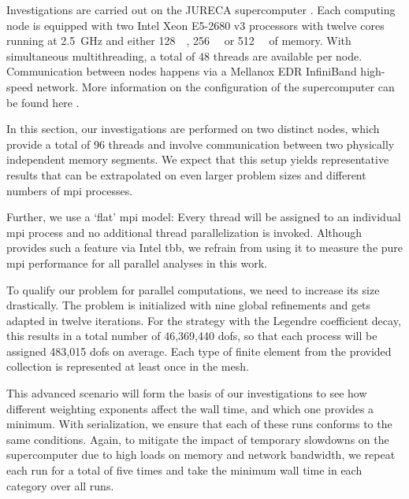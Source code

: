 
Investigations are carried out on the JURECA supercomputer \parencite{krause2016,jureca}. Each computing node is equipped with two Intel\textsuperscript{\textregistered} Xeon\textsuperscript{\textregistered} E5-2680 v3 processors with twelve cores running at \SI{2.5}{\giga\hertz} and either \SI{128}{\giga\byte}, \SI{256}{\giga\byte} or \SI{512}{\giga\byte} of memory. With simultaneous multithreading, a total of 48 threads are available per node. Communication between nodes happens via a Mellanox EDR InfiniBand high-speed network. More information on the configuration of the supercomputer can be found here \textcite{jureca}.

In this section, our investigations are performed on two distinct nodes, which provide a total of 96 threads and involve communication between two physically independent memory segments. We expect that this setup yields representative results that can be extrapolated on even larger problem sizes and different numbers of \gls{mpi} processes.

Further, we use a `flat' \gls{mpi} model: Every thread will be assigned to an individual \gls{mpi} process and no additional thread parallelization is invoked. Although \dealii{} provides such a feature via Intel\textsuperscript{\textregistered} \gls{tbb}, we refrain from using it to measure the pure \gls{mpi} performance for all parallel analyses in this work.


To qualify our problem for parallel computations, we need to increase its size drastically. The problem is initialized with nine global refinements and gets adapted in twelve iterations. For the strategy with the Legendre coefficient decay, this results in a total number of 46,369,440 \glspl{dof}, so that each process will be assigned 483,015 \glspl{dof} on average. Each type of finite element from the provided collection is represented at least once in the mesh.

This advanced scenario will form the basis of our investigations to see how different weighting exponents affect the wall time, and which one provides a minimum. With serialization, we ensure that each of these runs conforms to the same conditions. Again, to mitigate the impact of temporary slowdowns on the supercomputer due to high loads on memory and network bandwidth, we repeat each run for a total of five times and take the minimum wall time in each category over all runs.

